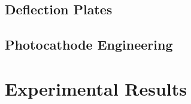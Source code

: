 \documentclass{uicthesi}
\begin{document}
\section{Deflection Plates}

\section{Photocathode Engineering}

\chapter{Experimental Results}

 


\end{document}

